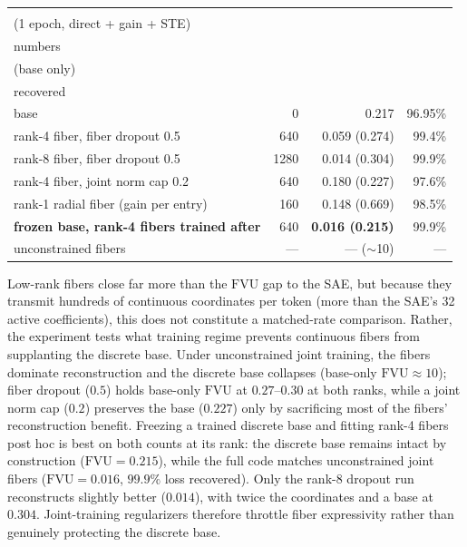\begin{center}\small
\begin{tabular}{@{}lrrr@{}}
\toprule
\stackhead{variant\\(1 epoch, direct + gain + STE)} & \stackhead[r]{extra\\numbers}
& \stackhead[r]{$\mathrm{FVU}$\\(base only)} & \stackhead[r]{loss\\recovered} \\
\midrule
base & 0 & 0.217 & 96.95\% \\
rank-4 fiber, fiber dropout 0.5 & 640 & 0.059 (0.274) & 99.4\% \\
rank-8 fiber, fiber dropout 0.5 & 1280 & 0.014 (0.304) & 99.9\% \\
rank-4 fiber, joint norm cap 0.2 & 640 & 0.180 (0.227) & 97.6\% \\
rank-1 radial fiber (gain per entry) & 160 & 0.148 (0.669) & 98.5\% \\
\textbf{frozen base, rank-4 fibers trained after} & 640 & \textbf{0.016 (0.215)} & 99.9\% \\
unconstrained fibers & --- & --- ($\sim$10) & --- \\
\bottomrule
\end{tabular}
\end{center}

Low-rank fibers close far more than the $\mathrm{FVU}$ gap to the SAE, but
because they transmit hundreds of continuous coordinates per token (more than
the SAE's 32 active coefficients), this does not constitute a matched-rate
comparison. Rather, the experiment tests what training regime prevents
continuous fibers from supplanting the discrete base. Under unconstrained
joint training, the fibers dominate reconstruction and the discrete base
collapses (base-only $\mathrm{FVU} \approx 10$); fiber dropout ($0.5$) holds
base-only $\mathrm{FVU}$ at $0.27$--$0.30$ at both ranks, while a joint norm
cap ($0.2$) preserves the base ($0.227$) only by sacrificing most of the
fibers' reconstruction benefit. Freezing a trained discrete base and fitting
rank-4 fibers post hoc is best on both counts at its rank: the discrete
base remains intact by construction ($\mathrm{FVU} = 0.215$), while the full
code matches unconstrained joint fibers ($\mathrm{FVU} = 0.016$, $99.9\%$
loss recovered). Only the rank-8 dropout run reconstructs slightly better
($0.014$), with twice the coordinates and a base at $0.304$. Joint-training regularizers therefore throttle fiber
expressivity rather than genuinely protecting the discrete base.

